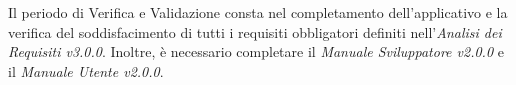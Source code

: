 Il periodo di Verifica e Validazione consta nel completamento dell'applicativo e la verifica del soddisfacimento di tutti i requisiti obbligatori definiti nell'\textit{Analisi dei Requisiti v3.0.0}. Inoltre, è necessario completare il \textit{Manuale Sviluppatore v2.0.0} e il \textit{Manuale Utente v2.0.0}.